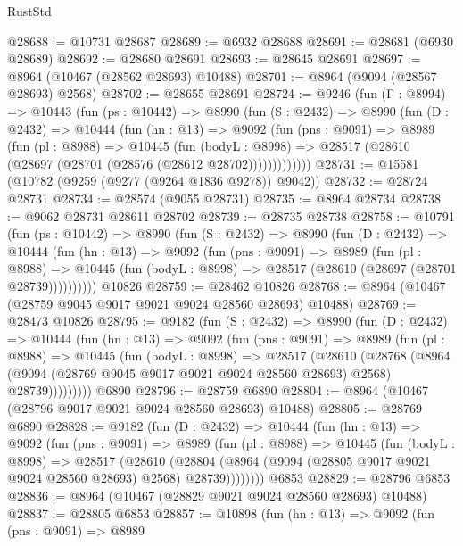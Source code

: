 \begin{lexlean}{RustStd}
\begin{coremodule}
@28688 := @10731 @28687
@28689 := @6932 @28688
@28691 := @28681 (@6930 @28689)
@28692 := @28680 @28691
@28693 := @28645 @28691
@28697 := @8964 (@10467 (@28562 @28693) @10488)
@28701 := @8964 (@9094 (@28567 @28693) @2568)
@28702 := @28655 @28691
@28724 := @9246
    (fun (Γ : @8994) =>
    @10443
      (fun (ps : @10442) =>
      @8990
        (fun (S : @2432) =>
        @8990
          (fun (D : @2432) =>
          @10444
            (fun (hn : @13) =>
            @9092
              (fun (pns : @9091) =>
              @8989
                (fun (pl : @8988) =>
                @10445
                  (fun (bodyL : @8998) =>
                  @28517 (@28610 (@28697 (@28701 (@28576 (@28612 @28702)))))))))))))
@28731 := @15581 (@10782 (@9259 (@9277 (@9264 @1836 @9278)) @9042))
@28732 := @28724 @28731
@28734 := @28574 (@9055 @28731)
@28735 := @8964 @28734
@28738 := @9062 @28731 @28611 @28702
@28739 := @28735 @28738
@28758 := @10791
    (fun (ps : @10442) =>
    @8990
      (fun (S : @2432) =>
      @8990
        (fun (D : @2432) =>
        @10444
          (fun (hn : @13) =>
          @9092
            (fun (pns : @9091) =>
            @8989
              (fun (pl : @8988) =>
              @10445 (fun (bodyL : @8998) => @28517 (@28610 (@28697 (@28701 @28739))))))))))
    @10826
@28759 := @28462 @10826
@28768 := @8964 (@10467 (@28759 @9045 @9017 @9021 @9024 @28560 @28693) @10488)
@28769 := @28473 @10826
@28795 := @9182
    (fun (S : @2432) =>
    @8990
      (fun (D : @2432) =>
      @10444
        (fun (hn : @13) =>
        @9092
          (fun (pns : @9091) =>
          @8989
            (fun (pl : @8988) =>
            @10445
              (fun (bodyL : @8998) =>
              @28517
                (@28610
                  (@28768
                    (@8964
                      (@9094 (@28769 @9045 @9017 @9021 @9024 @28560 @28693) @2568)
                      @28739)))))))))
    @6890
@28796 := @28759 @6890
@28804 := @8964 (@10467 (@28796 @9017 @9021 @9024 @28560 @28693) @10488)
@28805 := @28769 @6890
@28828 := @9182
    (fun (D : @2432) =>
    @10444
      (fun (hn : @13) =>
      @9092
        (fun (pns : @9091) =>
        @8989
          (fun (pl : @8988) =>
          @10445
            (fun (bodyL : @8998) =>
            @28517
              (@28610
                (@28804 (@8964 (@9094 (@28805 @9017 @9021 @9024 @28560 @28693) @2568) @28739))))))))
    @6853
@28829 := @28796 @6853
@28836 := @8964 (@10467 (@28829 @9021 @9024 @28560 @28693) @10488)
@28837 := @28805 @6853
@28857 := @10898
    (fun (hn : @13) =>
    @9092
      (fun (pns : @9091) =>
      @8989

\end{coremodule}
\end{lexlean}
